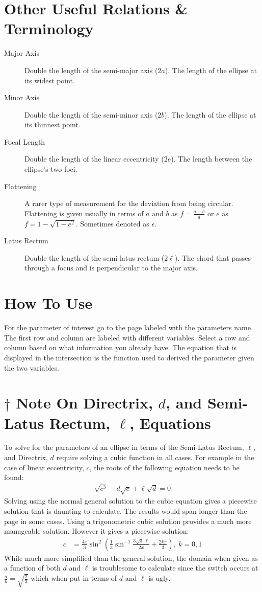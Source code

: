 \documentclass{article}
\begin{document}
\section*{Other Useful Relations \& Terminology}
\begin{description}
\item[Major Axis] Double the length of the semi-major axis ($2a$). The length of the ellipse at its widest point.
\item[Minor Axis] Double the length of the semi-minor axis ($2b$). The length of the ellipse at its thinnest point.
\item[Focal Length] Double the length of the linear eccentricity ($2e$). The length between the ellipse's two foci.
\item[Flattening] A rarer type of measurement for the deviation from being circular. Flattening is given usually in terms of $a$ and $b$ as $f=\frac{a-b}{a}$ or $e$ as $f=1-\sqrt{1-e^2}$. Sometimes denoted as $\epsilon$.
\item[Latus Rectum] Double the length of the semi-latus rectum ($2\ell$). The chord that passes through a focus and is perpendicular to the major axis.
\end{description}

\section*{How To Use}
For the parameter of interest go to the page labeled with the parameters name. 
The first row and column are labeled with different variables. 
Select a row and column based on what information you already have. 
The equation that is displayed in the intersection is the function used to derived the parameter given the two variables. 

\section*{$\dagger$ Note On Directrix, $d$, and Semi-Latus Rectum, $\ell$, Equations}
To solve for the parameters of an ellipse in terms of the Semi-Latus Rectum, $\ell$, and Directrix, $d$ require solving a cubic function in all cases. For example in the case of linear eccentricity, $c$, the roots of the following equation needs to be found:
\begin{align*} %
\sqrt{c^3}-d \sqrt{c} +\ell\sqrt{d} = 0
\end{align*}
Solving using the normal general solution to the cubic equation gives a piecewise solution that is daunting to calculate. The results would span longer than the page in some cases.
Using a trigonometric cubic solution provides a much more manageable solution. However it gives a piecewise solution:
\begin{align*} 
c &=\frac{4x}{3} \sin^2
  \left(
    \frac{1}{3} \sin^{-1} \frac{3\sqrt{3}\, \ell}{2x}+\frac{2k\pi}{3}
  \right),\ k=0,1 
\end{align*}
While much more simplified than the general solution, the domain when given as a function of both $d$ and $\ell$ is troublesome to calculate since the switch occurs at $\frac{a}{b}=\sqrt{\frac{2}{3}}$ which when put in terms of $d$ and $\ell$ is ugly.
\newpage
\end{document}
